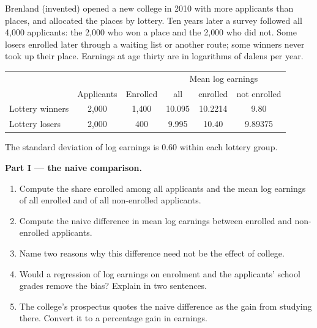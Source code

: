 \begin{problem}\label{pb:b3:instrumental-variables:lottery}
Brenland (invented) opened a new college in 2010 with more applicants than
places, and allocated the places by lottery. Ten years later a survey
followed all 4{,}000 applicants: the 2{,}000 who won a place and the 2{,}000
who did not. Some losers enrolled later through a waiting list or another
route; some winners never took up their place. Earnings at age thirty are in
logarithms of dalens per year.

\begin{center}
\begin{tabular}{lccccc}
  & & & \multicolumn{3}{c}{Mean log earnings} \\
  & Applicants & Enrolled & all & enrolled & not enrolled \\ \hline
  Lottery winners & 2{,}000 & 1{,}400 & 10.095 & 10.2214 & 9.80 \\
  Lottery losers & 2{,}000 & 400 & 9.995 & 10.40 & 9.89375 \\ \hline
\end{tabular}
\end{center}
The standard deviation of log earnings is 0.60 within each lottery group.

\medskip\noindent\textbf{Part I --- the naive comparison.}
\begin{enumerate}
\item Compute the share enrolled among all applicants and the mean log
earnings of all enrolled and of all non-enrolled applicants.
\item Compute the naive difference in mean log earnings between enrolled and
non-enrolled applicants.
\item Name two reasons why this difference need not be the effect of college.
\item Would a regression of log earnings on enrolment and the applicants'
school grades remove the bias? Explain in two sentences.
\item The college's prospectus quotes the naive difference as the gain from
studying there. Convert it to a percentage gain in earnings.
\end{enumerate}


\end{problem}
